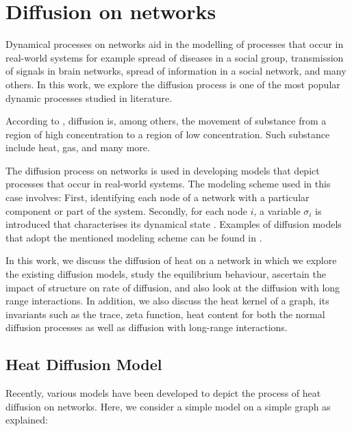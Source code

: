 \documentclass[10pt,a4paper]{article}
\theoremstyle{plain}
\theoremstyle{definition}
\begin{document}
    \newpage
    \section{Diffusion on networks}
    Dynamical processes on networks aid in the modelling of processes that occur in real-world systems for example spread of diseases in a social group, transmission of signals in brain networks, spread of information in a social network, and many others. In this work, we explore the diffusion process is one of the most popular dynamic processes studied in literature.
    
    According to \citep{newman2010networks}, diffusion is, among others, the movement of substance from a region of high concentration to a region of low concentration. Such substance include heat, gas, and many more. 
    
    The diffusion process on networks is used in developing models that depict processes that occur in real-world systems. The modeling scheme used in this case involves: First, identifying each node of a network with a particular component or part of the system. Secondly, for each node $i$, a variable $\sigma_i$ is introduced that characterises its dynamical state \citep{barrat2008dynamical}. Examples of diffusion models that adopt the mentioned modeling scheme can be found in \citep{estrada2011epidemic,kasprzak2012diffusion,lopez2008diffusion}. 
    
    In this work, we discuss the diffusion of heat on a network in which we explore the existing diffusion models, study the equilibrium behaviour, ascertain the impact of structure on rate of diffusion, and also look at the diffusion with long range interactions. In addition, we also discuss the heat kernel of a graph, its invariants such as the trace, zeta function, heat content for both the normal diffusion processes as well as diffusion with long-range interactions.
    
    \subsection{Heat Diffusion Model}
    Recently, various models have been developed to depict the process of heat diffusion on networks. Here, we consider a simple model on a simple graph as explained:
    
    
\end{document}
